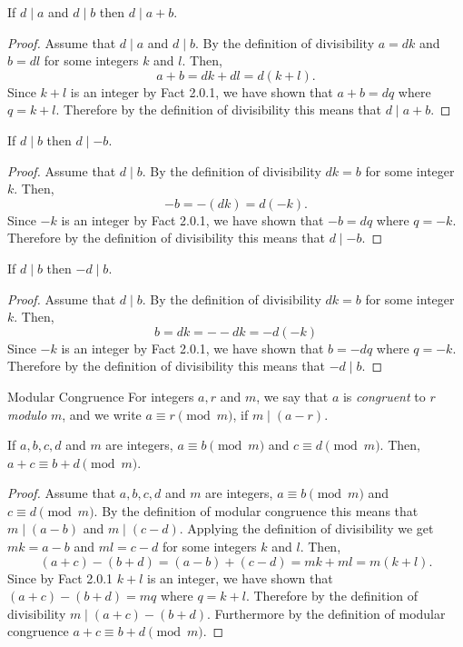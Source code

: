 \documentclass{report}
\begin{document}
\begin{proposition}{}{}
  If $d \mid a$ and $d \mid b$ then $d \mid a + b$.
\end{proposition}

\begin{proof}
  Assume that $d \mid a$ and $d \mid b$.
  By the definition of divisibility $a = dk$ and $b = dl$ for some integers $k$ and $l$.
  Then, $$a + b = dk + dl = d(k + l).$$
  Since $k + l$ is an integer by Fact 2.0.1, we have shown that $a + b = dq$ where $q = k + l$.
  Therefore by the definition of divisibility this means that $d \mid a + b$.
\end{proof}

\begin{proposition}{}{}
  If $d \mid b$ then $d \mid -b$.
\end{proposition}

\begin{proof}
  Assume that $d \mid b$.
  By the definition of divisibility $dk = b$ for some integer $k$.
  Then, $$-b = -(dk) = d(-k).$$
  Since $-k$ is an integer by Fact 2.0.1, we have shown that $-b = dq$ where $q = -k$.
  Therefore by the definition of divisibility this means that $d \mid -b$.
\end{proof}

\begin{proposition}{}{}
  If $d \mid b$ then $-d \mid b$.
\end{proposition}

\begin{proof}
  Assume that $d \mid b$.
  By the definition of divisibility $dk = b$ for some integer $k$.
  Then, $$b = dk = --dk = -d(-k)$$
  Since $-k$ is an integer by Fact 2.0.1, we have shown that $b = -dq$ where $q = -k$.
  Therefore by the definition of divisibility this means that $-d \mid b$.
\end{proof}

\begin{definition}{Modular Congruence}{}
  For integers $a, r$ and $m$, we say that $a$ is \emph{congruent} to $r$ \emph{modulo} $m$, and we write $a \equiv r \pmod{m}$, if $m \mid (a - r)$.
\end{definition}

\begin{proposition}{}{}
  If $a,b,c,d$ and $m$ are integers, $a \equiv b \pmod{m}$ and $c \equiv d \pmod{m}$. Then, $a + c \equiv b + d \pmod{m}$.
\end{proposition}

\begin{proof}
  Assume that $a,b,c,d$ and $m$ are integers, $a \equiv b \pmod{m}$ and $c \equiv d \pmod{m}$.
  By the definition of modular congruence this means that $m \mid (a - b)$ and $m \mid (c - d)$.
  Applying the definition of divisibility we get $mk = a - b$ and $ml = c - d$ for some integers $k$ and $l$.
  Then, $$(a + c) - (b + d) = (a - b) + (c - d) = mk + ml = m(k + l).$$
  Since by Fact 2.0.1 $k + l$ is an integer, we have shown that $(a + c) - (b + d) = mq$ where $q = k + l$.
  Therefore by the definition of divisibility $m \mid (a + c) - (b + d)$.
  Furthermore by the definition of modular congruence $a + c \equiv b + d \pmod{m}$.
\end{proof}
\end{document}
